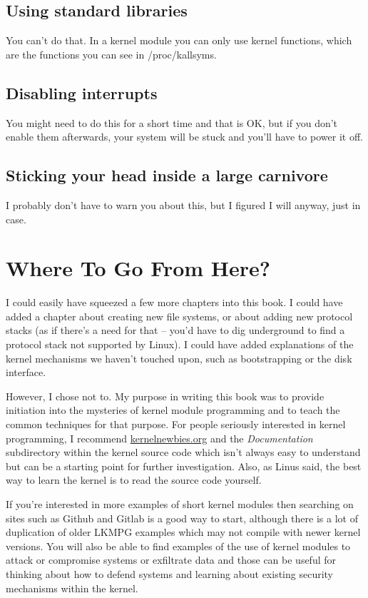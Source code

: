 \documentclass[11pt]{article}
\begin{document}
\subsection*{Using standard libraries}
\label{sec-19-1}
You can't do that. In a kernel module you can only use kernel functions, which are the functions you can see in /proc/kallsyms.

\subsection*{Disabling interrupts}
\label{sec-19-2}
You might need to do this for a short time and that is OK, but if you don't enable them afterwards, your system will be stuck and you'll have to power it off.

\subsection*{Sticking your head inside a large carnivore}
\label{sec-19-3}
I probably don't have to warn you about this, but I figured I will anyway, just in case.

\section*{Where To Go From Here?}
\label{sec-20}
I could easily have squeezed a few more chapters into this book. I could have added a chapter about creating new file systems, or about adding new protocol stacks (as if there's a need for that -- you'd have to dig underground to find a protocol stack not supported by Linux). I could have added explanations of the kernel mechanisms we haven't touched upon, such as bootstrapping or the disk interface.

However, I chose not to. My purpose in writing this book was to provide initiation into the mysteries of kernel module programming and to teach the common techniques for that purpose. For people seriously interested in kernel programming, I recommend \href{https://kernelnewbies.org}{kernelnewbies.org} and the \emph{Documentation} subdirectory within the kernel source code which isn't always easy to understand but can be a starting point for further investigation. Also, as Linus said, the best way to learn the kernel is to read the source code yourself.

If you're interested in more examples of short kernel modules then searching on sites such as Github and Gitlab is a good way to start, although there is a lot of duplication of older LKMPG examples which may not compile with newer kernel versions. You will also be able to find examples of the use of kernel modules to attack or compromise systems or exfiltrate data and those can be useful for thinking about how to defend systems and learning about existing security mechanisms within the kernel.
\end{document}
